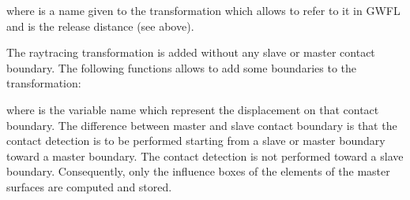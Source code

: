 \documentclass[a4paper,11pt,english]{sphinxmanual}
\begin{document}
\begin{sphinxVerbatim}[commandchars=\\\{\}]
     
                                     
\end{sphinxVerbatim}

where  is a name given to the transformation which allows to refer to it in GWFL and  is the release distance (see above).

The raytracing transformation is added without any slave or master contact boundary. The following functions allows to add some boundaries to the transformation:

\begin{sphinxVerbatim}[commandchars=\\\{\}]
 
                
               

 
                
               
\end{sphinxVerbatim}

where  is the variable name which represent the displacement on that contact
boundary. The difference between master and slave contact boundary is that the contact detection is to be performed starting from a slave or master boundary toward a master boundary. The contact detection is not performed toward a slave boundary. Consequently, only the influence boxes of the elements of the master surfaces are computed and stored.
\end{document}
